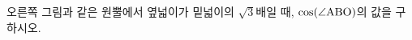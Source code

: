 \noindent\begin{minipage}[t]{0.58\linewidth}\vspace{0pt}\raggedright 오른쪽 그림과 같은 원뿔에서 옆넓이가 밑넓이의 $\sqrt{3}$배일 때, $\cos(\angle\mathrm{ABO})$의 값을 구하시오.\end{minipage}\hfill\begin{minipage}[t]{0.4\linewidth}\vspace{0pt}\centering \resizebox{\ifdim\width>\linewidth\linewidth\else\width\fi}{!}{}\end{minipage}\par
